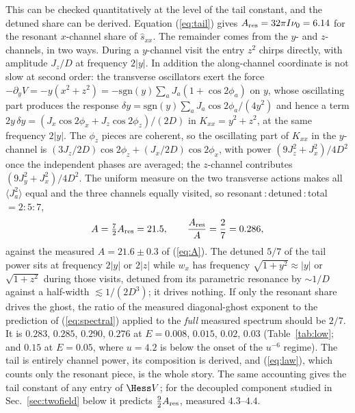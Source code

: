 

This can be checked quantitatively at the level of the tail constant, and the detuned share can
be derived. Equation (\ref{eq:tail}) gives $A_{\rm res}=32\pi I\nu_0=6.14$ for the resonant
$x$-channel share of $\hat s_{xx}$. The remainder comes from the $y$- and $z$-channels, in two
ways. During a $y$-channel visit the entry $z^2$ chirps directly, with amplitude $J_z/D$ at
frequency $2|y|$. In addition the along-channel coordinate is not slow at second order: the
transverse oscillators exert the force $-\partial_yV=-y(x^2+z^2)=-\mathrm{sgn}(y)\sum_a
J_a(1+\cos2\phi_a)$ on $y$, whose oscillating part produces the response
$\delta y=\mathrm{sgn}(y)\sum_aJ_a\cos2\phi_a/(4y^2)$ and hence a term
$2y\,\delta y=(J_x\cos2\phi_x+J_z\cos2\phi_z)/(2D)$ in $K_{xx}=y^2+z^2$, at the same frequency
$2|y|$. The $\phi_z$ pieces are coherent, so the oscillating part of $K_{xx}$ in the $y$-channel
is $(3J_z/2D)\cos2\phi_z+(J_x/2D)\cos2\phi_x$, with power $(9J_z^2+J_x^2)/4D^2$ once the
independent phases are averaged; the $z$-channel contributes $(9J_y^2+J_x^2)/4D^2$. The uniform
measure on the two transverse actions makes all $\langle J_a^2\rangle$ equal and the three
channels equally visited, so resonant\,:\,detuned\,:\,total $=2:5:7$,
\begin{equation}
A=\tfrac72A_{\rm res}=21.5,\qquad \frac{A_{\rm res}}{A}=\frac27=0.286,
\label{eq:seven}
\end{equation}
against the measured $A=21.6\pm0.3$ of (\ref{eq:A}). The detuned $5/7$ of the tail power sits at
frequency $2|y|$ or $2|z|$ while $w_x$ has frequency $\sqrt{1+y^2}\approx|y|$ or $\sqrt{1+z^2}$
during those visits, detuned from its parametric resonance by $\sim1/D$ against a half-width
$\lesssim1/(2D^3)$; it drives nothing. If only the resonant share drives the ghost, the ratio of
the measured diagonal-ghost exponent to the prediction of (\ref{eq:spectral}) applied to the
\emph{full} measured spectrum should be $2/7$. It is $0.283$, $0.285$, $0.290$, $0.276$ at
$E=0.008$, $0.015$, $0.02$, $0.03$ (Table~\ref{tab:low}; and $0.15$ at $E=0.05$, where $u=4.2$ is
below the onset of the $u^{-6}$ regime). The tail is entirely channel power, its composition is
derived, and (\ref{eq:law}), which counts only the resonant piece, is the whole story. The same
accounting gives the tail constant of any entry of $\Hess V$; for the decoupled component studied
in Sec.~\ref{sec:twofield} below it predicts $\tfrac92A_{\rm res}$, measured $4.3$--$4.4$.

